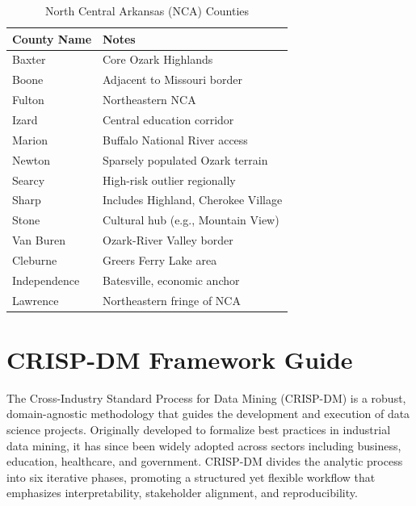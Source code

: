 \begin{table}[H]
\centering
\caption{North Central Arkansas (NCA) Counties}
\label{tab:appendix_nca_counties}
\begin{tabular}{ll}
\toprule
\textbf{County Name} & \textbf{Notes} \\
\midrule
Baxter         & Core Ozark Highlands \\
Boone          & Adjacent to Missouri border \\
Fulton         & Northeastern NCA \\
Izard          & Central education corridor \\
Marion         & Buffalo National River access \\
Newton         & Sparsely populated Ozark terrain \\
Searcy         & High-risk outlier regionally \\
Sharp          & Includes Highland, Cherokee Village \\
Stone          & Cultural hub (e.g., Mountain View) \\
Van Buren      & Ozark-River Valley border \\
Cleburne       & Greers Ferry Lake area \\
Independence   & Batesville, economic anchor \\
Lawrence       & Northeastern fringe of NCA \\
\bottomrule
\end{tabular}
\end{table}

\section{CRISP-DM Framework Guide}
The Cross-Industry Standard Process for Data Mining (CRISP-DM) is a robust, domain-agnostic methodology that guides the development and execution of data science projects. Originally developed to formalize best practices in industrial data mining, it has since been widely adopted across sectors including business, education, healthcare, and government. CRISP-DM divides the analytic process into six iterative phases, promoting a structured yet flexible workflow that emphasizes interpretability, stakeholder alignment, and reproducibility.


